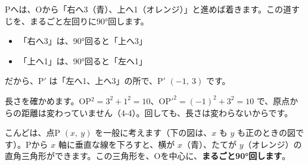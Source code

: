 \begin{minipage}[c]{0.55\linewidth}
\raggedright
Pへは、Oから「右へ3（青）、上へ1（オレンジ）」と進めば着きます。この道すじを、まるごと左回りに90°回します。
\begin{itemize}[leftmargin=1.2\zw, itemsep=2pt, topsep=2pt, label={\color{\bkTT}●}]
\item 「右へ3」は、90°回ると「上へ3」
\item 「上へ1」は、90°回ると「左へ1」
\end{itemize}
だから、P$'$ は「左へ1、上へ3」の所で、P$'$ $(-1,\ 3)$ です。
\end{minipage}\par\vspace{4pt}
長さを確かめます。OP$^2=3^2+1^2=10$、OP$'^2=(-1)^2+3^2=10$ で、原点からの距離は変わっていません（4-4）。回しても、長さは変わらないからです。

こんどは、点P $(x,\ y)$ を一般に考えます（下の図は、$x$ も $y$ も正のときの図です）。Pから $x$ 軸に垂直な線を下ろすと、横が $x$（青）、たてが $y$（オレンジ）の直角三角形ができます。この三角形を、Oを中心に、\textbf{まるごと90°回します}。

